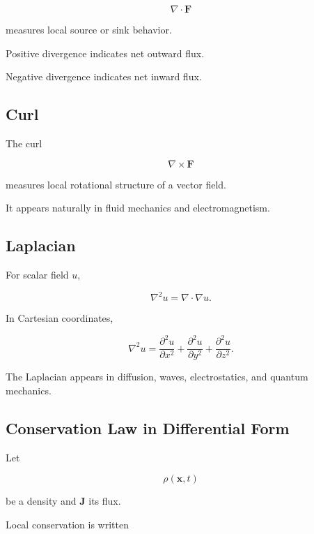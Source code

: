\[
\boxed{
\nabla\cdot\mathbf{F}
}
\]

measures local source or sink behavior.

Positive divergence indicates net outward flux.

Negative divergence indicates net inward flux.

\subsection{Curl}
\label{subsec:physical-curl}

The curl

\[
\boxed{
\nabla\times\mathbf{F}
}
\]

measures local rotational structure of a vector field.

It appears naturally in fluid mechanics and electromagnetism.

\subsection{Laplacian}
\label{subsec:physical-laplacian}

For scalar field \(u\),

\[
\boxed{
\nabla^2u
=
\nabla\cdot\nabla u.
}
\]

In Cartesian coordinates,

\[
\boxed{
\nabla^2u
=
\frac{\partial^2u}{\partial x^2}
+
\frac{\partial^2u}{\partial y^2}
+
\frac{\partial^2u}{\partial z^2}.
}
\]

The Laplacian appears in diffusion, waves, electrostatics, and quantum
mechanics.

\subsection{Conservation Law in Differential Form}
\label{subsec:conservation-law-differential-form}

Let

\[
\rho(\mathbf{x},t)
\]

be a density and \(\mathbf{J}\) its flux.

Local conservation is written

